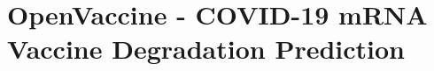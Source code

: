 \section{OpenVaccine - COVID-19 mRNA Vaccine Degradation Prediction} \label{proposal2}



\cite{Imran2021}
\cite{Singhal2021}
\cite{Qaid2021}
\cite{Kaggle2020}
